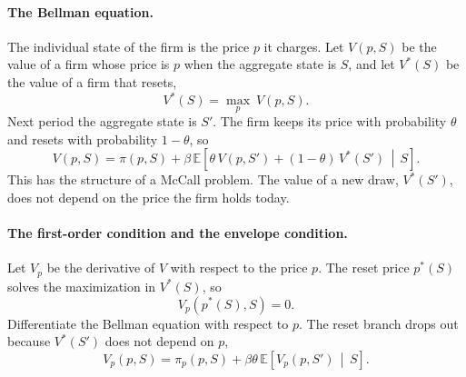 \documentclass[11pt]{article}
\begin{document}
\paragraph{The Bellman equation.} The individual state of the firm is the price $p$ it charges. Let $V(p, S)$ be the value of a firm whose price is $p$ when the aggregate state is $S$, and let $V^{*}(S)$ be the value of a firm that resets,
\begin{equation*}
V^{*}(S) = \max_{p} \ V(p, S) .
\end{equation*}
Next period the aggregate state is $S'$. The firm keeps its price with probability $\theta$ and resets with probability $1-\theta$, so
\begin{equation*}
V(p, S) = \pi(p, S) + \beta\, \mathbb{E} \left[ \theta\, V(p, S') + (1-\theta)\, V^{*}(S') \, \middle| \, S \right] .
\end{equation*}
This has the structure of a McCall problem. The value of a new draw, $V^{*}(S')$, does not depend on the price the firm holds today.

\paragraph{The first-order condition and the envelope condition.} Let $V_p$ be the derivative of $V$ with respect to the price $p$. The reset price $p^{*}(S)$ solves the maximization in $V^{*}(S)$, so
\begin{equation*}
V_p \left( p^{*}(S), S \right) = 0 .
\end{equation*}
Differentiate the Bellman equation with respect to $p$. The reset branch drops out because $V^{*}(S')$ does not depend on $p$,
\begin{equation*}
V_p(p, S) = \pi_p(p, S) + \beta\theta\, \mathbb{E} \left[ V_p(p, S') \, \middle| \, S \right] .
\end{equation*}
\end{document}
